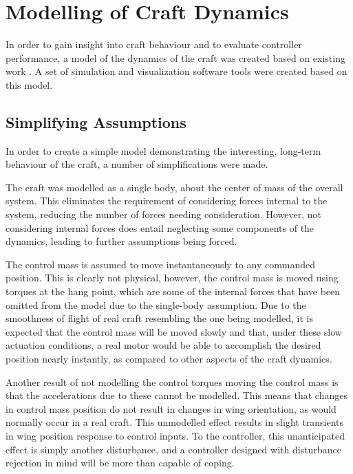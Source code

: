 \documentclass{sydeStyle}
\begin{document}
\section{Modelling of Craft Dynamics}

In order to gain insight into craft behaviour and to evaluate controller
performance, a model of the dynamics of the craft was created based on existing
work \cite{Rogallo1960}\cite{Layton1963}\cite{spottiswoode}. A set of simulation
and visualization software tools were created based on this model.

\subsection{Simplifying Assumptions}

In order to create a simple model demonstrating the interesting, long-term
behaviour of the craft, a number of simplifications were made.

The craft was modelled as a single body, about the center of mass of the overall
system. This eliminates the requirement of considering forces internal to the
system, reducing the number of forces needing consideration. However, not
considering internal forces does entail neglecting some components of the
dynamics, leading to further assumptions being forced.

The control mass is assumed to move instantaneously to any commanded position.
This is clearly not physical, however, the control mass is moved using torques
at the hang point, which are some of the internal forces that have been omitted
from the model due to the single-body assumption. Due to the smoothness of
flight of real craft resembling the one being modelled, it is expected that the
control mass will be moved slowly and that, under these slow actuation
conditions, a real motor would be able to accomplish the desired position
nearly instantly, as compared to other aspects of the craft dynamics.

Another result of not modelling the control torques moving the control mass is
that the accelerations due to these cannot be modelled. This means that changes in
control mass position do not result in changes in wing orientation, as would
normally occur in a real craft. This unmodelled effect results in slight
transients in wing position response to control inputs. To the controller, this
unanticipated effect is simply another disturbance, and a controller designed
with disturbance rejection in mind will be more than capable of coping.
\end{document}
